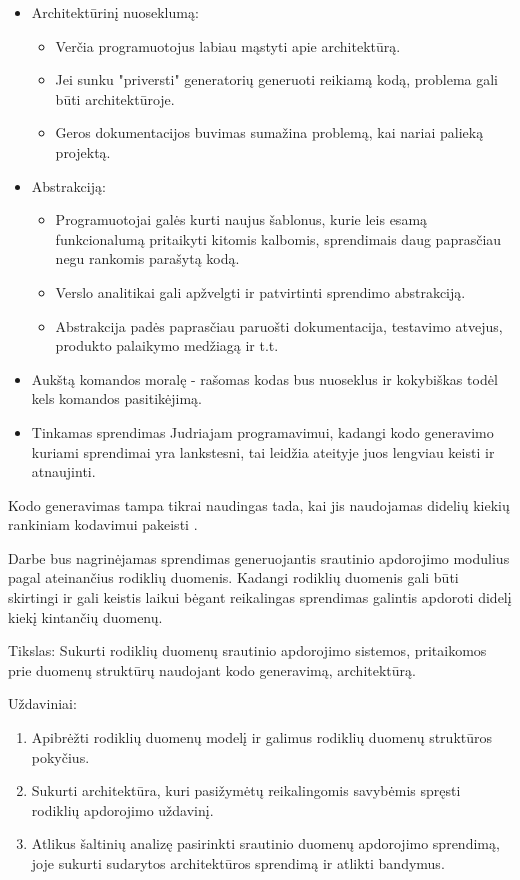 \documentclass{VUMIFPSbakalaurinis}
\begin{document}
\begin{itemize}
    \item Architektūrinį nuoseklumą: 
    \begin{itemize}
        \item Verčia programuotojus labiau mąstyti apie architektūrą.
        \item Jei sunku "priversti" generatorių generuoti reikiamą kodą, problema gali būti architektūroje.
        \item Geros dokumentacijos buvimas sumažina problemą, kai nariai palieką projektą.
    \end{itemize}
    \item Abstrakciją:
    \begin{itemize}
        \item Programuotojai galės kurti naujus šablonus, kurie leis esamą funkcionalumą pritaikyti kitomis kalbomis, sprendimais daug paprasčiau negu rankomis parašytą kodą.
        \item Verslo analitikai gali apžvelgti ir patvirtinti sprendimo abstrakciją.
        \item Abstrakcija padės paprasčiau paruošti dokumentacija, testavimo atvejus, produkto palaikymo medžiagą ir t.t.  
    \end{itemize}
    \item Aukštą komandos moralę - rašomas kodas bus nuoseklus ir kokybiškas todėl kels komandos pasitikėjimą.
    \item Tinkamas sprendimas Judriajam programavimui, kadangi kodo generavimo kuriami sprendimai yra lankstesni, tai leidžia ateityje juos lengviau keisti ir atnaujinti.   
\end{itemize} 
Kodo generavimas tampa tikrai naudingas tada, kai jis naudojamas didelių kiekių rankiniam kodavimui pakeisti \cite{herrington2003code}. \par
Darbe bus nagrinėjamas sprendimas generuojantis srautinio apdorojimo modulius pagal ateinančius rodiklių duomenis. Kadangi rodiklių duomenis gali būti skirtingi ir gali keistis laikui bėgant reikalingas sprendimas galintis apdoroti didelį kiekį kintančių duomenų.  

Tikslas: Sukurti rodiklių duomenų srautinio apdorojimo sistemos, pritaikomos prie duomenų struktūrų naudojant kodo generavimą, architektūrą.

Uždaviniai:
\begin{enumerate}
    \item Apibrėžti rodiklių duomenų modelį ir galimus rodiklių duomenų struktūros pokyčius.
    \item Sukurti architektūra, kuri pasižymėtų reikalingomis savybėmis spręsti rodiklių apdorojimo uždavinį. 
    \item Atlikus šaltinių analizę pasirinkti srautinio duomenų apdorojimo sprendimą, joje sukurti sudarytos architektūros sprendimą ir atlikti bandymus.
\end{enumerate}
\end{document}
